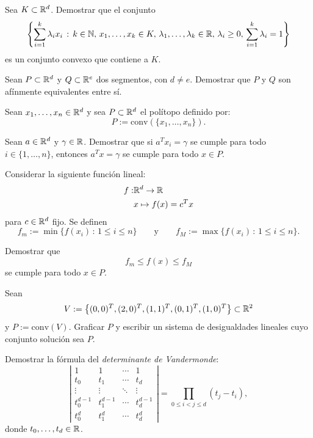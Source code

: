 \documentclass[a4paper,12pt]{article}
\renewcommand{\conv}[1]{\mathrm{conv}(#1)}
\begin{document}
\begin{exerciselist}
  \item Sea $K \subset \mathbb{R}^d$. Demostrar que el conjunto
  $$
  \left\{ \sum_{i=1}^k \lambda_i x_i \, : \, k \in \mathbb{N}, \, x_1, \ldots, x_k \in K, \, \lambda_1, \ldots, \lambda_k \in \mathbb{R}, \,  \lambda_i \geq 0, \, \sum_{i=1}^k \lambda_i = 1 \right\}
  $$
  es un conjunto convexo que contiene a $K$.

  \item Sean $P \subset \mathbb{R}^d$ y $Q \subset \mathbb{R}^e$ dos segmentos, con $d \neq e$. Demostrar que $P$ y $Q$  son afínmente equivalentes entre sí.

  \item Sean $x_1, \ldots, x_n \in \mathbb{R}^d$ y sea $P \subset \mathbb{R}^d$ el polítopo definido por:
  $$
  P:= \conv{\{ x_1, \ldots, x_n \}}.
  $$
  \begin{exerciselist}
  \item Sean $a \in \mathbb{R}^d$ y $\gamma \in \mathbb{R}$. Demostrar que si $a^T x_i = \gamma$ se cumple para todo $i \in \{1, \ldots, n\}$, entonces $a^T x = \gamma$ se cumple para todo $x \in P$.
  \item Considerar la siguiente función lineal:
  \begin{align*}
  f :& \mathbb{R}^d \to \mathbb{R}\\
  &x \mapsto f(x) = c^T x
  \end{align*}
  para $c \in \mathbb{R}^d$ fijo. Se definen
  $$
  f_m := \min \{f(x_i) \, : \, 1 \leq i \leq n \}
  \qquad \mbox{y} \qquad
  f_M := \max \{f(x_i) \, : \, 1 \leq i \leq n \}.
  $$

  Demostrar que
  $$
  f_m \leq f(x) \leq f_M
  $$
  se cumple para todo $x \in P$.
\end{exerciselist}

\item Sean
$$
V := \left\{(0,0)^T, (2,0)^T, (1,1)^T, (0,1)^T, (1,0)^T\right\} \subset \mathbb{R}^2
$$
y $P:=\conv{V}$. Graficar $P$ y escribir un sistema de desigualdades lineales cuyo conjunto solución sea $P$.

\item Demostrar la fórmula del \emph{determinante de Vandermonde}:
$$
\left|
\begin{array}{cccc}
  1 & 1 & \cdots & 1 \\
  t_0 & t_1 & \cdots & t_d \\
  \vdots & \vdots & \ddots & \vdots \\
  t_0^{d-1} & t_1^{d-1} & \cdots & t_d^{d-1} \\
  t_0^{d} & t_1^{d} & \cdots & t_d^{d}
\end{array}
\right| =
\prod_{0 \leq i < j \leq d} (t_j - t_i),
$$
donde $t_0, \ldots, t_d \in \mathbb{R}$.


\end{exerciselist}
\end{document}
